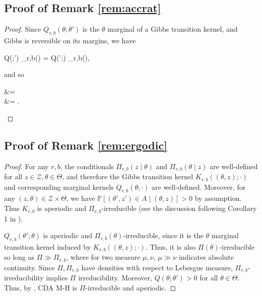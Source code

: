 \documentclass[11pt]{article}
\newcommand{\be}{\begin{equs}}
\newcommand{\ee}{\end{equs}}
\newcommand{\bb}[1]{\mathbb{#1}}
\newcommand{\mc}[1]{\mathcal{#1}}
\begin{document}
\subsection{Proof of Remark \ref{rem:accrat}}
\begin{proof}
Since $Q_{r,b}(\theta;\theta')$ is the $\theta$ marginal of a Gibbs transition kernel, and Gibbs is reversible on its margins, we have
\be
Q(\theta;\theta') \Pi_{r,b}(\theta) = Q(\theta';\theta) \Pi_{r,b}(\theta),
\ee 
and so
\be
{} &=  \\
&= .
\ee
\end{proof}

\subsection{Proof of Remark \ref{rem:ergodic}}
\begin{proof}
For any $r,b$, the conditionals $\Pi_{r,b}(z \mid \theta)$ and $\Pi_{r,b}(\theta \mid z)$ are well-defined for all $z \in \mc Z, \theta \in \Theta$, and therefore the Gibbs transition kernel $K_{r,b}((\theta,z);\cdot)$ and corresponding marginal kernels $Q_{r,b}(\theta;\cdot)$ are well-defined. Moreover, for any $(z,\theta) \in \mc Z \times \Theta$, we have $\bb P[(\theta',z') \in A \mid (\theta,z)] > 0$ by assumption. Thus $K_{r,b}$ is aperiodic and $\Pi_{r,b}$-irreducible (see the discussion following Corollary 1 in \cite{roberts1994simple}).

$Q_{r,b}(\theta';\theta)$ is aperiodic and $\Pi_{r,b}(\theta)$-irreducible, since it is the $\theta$ marginal transition kernel induced by $K_{r,b}((\theta,z);\cdot)$. Thus, it is also $\Pi(\theta)$-irreducible so long as $\Pi \gg \Pi_{r,b}$, where for two measure $\mu,\nu$, $\mu \gg \nu$ indicates absolute continuity. Since $\Pi, \Pi_{r,b}$ have densities with respect to Lebesgue measure, $\Pi_{r,b}$-irreducibility implies $\Pi$ irreducibility. Moreover, $Q(\theta;\theta') > 0$ for all $\theta \in \Theta$. Thus, by \cite[Theorem 3]{roberts1994simple}, CDA M-H is $\Pi$-irreducible and aperiodic. 
\end{proof}
\end{document}
